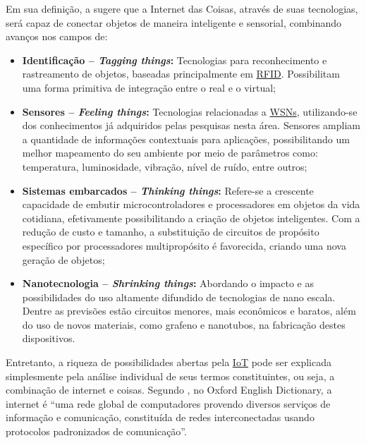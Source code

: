 \documentclass[twoside,english,brazilian]{UNISINOSmonografia}
\begin{document}
	Em sua definição, a  sugere que a Internet das 
	Coisas, através de suas tecnologias, será capaz de conectar objetos de 
	maneira inteligente e sensorial, combinando avanços nos campos de:
	\begin{itemize}
		\item \textbf{Identificação -- \textit{Tagging things}:} Tecnologias para 
		reconhecimento e rastreamento de objetos, baseadas principalmente 
		em \hyperref[siglas]{RFID}. Possibilitam uma forma primitiva de integração entre o 
		real e o virtual;
		
		\item \textbf{Sensores -- \textit{Feeling things}:} Tecnologias 
		relacionadas a \hyperref[siglas]{WSNs}, utilizando-se dos conhecimentos já adquiridos 
		pelas pesquisas nesta área. Sensores ampliam a quantidade de 
		informações contextuais para aplicações, possibilitando um melhor 
		mapeamento do seu ambiente por meio de parâmetros como: 
		temperatura, luminosidade, vibração, nível de ruído, entre outros;
		
		\item \textbf{Sistemas embarcados -- \textit{Thinking things}:} Refere-se 
		a crescente capacidade de embutir microcontroladores e 	
		processadores em objetos da vida cotidiana, efetivamente 
		possibilitando a criação de objetos inteligentes. Com a redução de 
		custo e tamanho, a substituição de circuitos de propósito 
		específico por processadores multipropósito é favorecida, criando 
		uma nova geração de objetos;
		
		\item \textbf{Nanotecnologia -- \textit{Shrinking things}:} Abordando o 
		impacto e as possibilidades do uso altamente difundido de 
		tecnologias de nano escala. Dentre as previsões estão circuitos 
		menores, mais econômicos e baratos, além do uso de novos 
		materiais, como grafeno e nanotubos, na fabricação destes 
		dispositivos.
	\end{itemize}
	
	Entretanto, a riqueza de possibilidades abertas pela \hyperref[siglas]{IoT} pode ser 
	explicada simplesmente pela análise individual de seus termos 
	constituintes, ou seja, a combinação de internet e coisas. Segundo 
	, no Oxford English Dictionary, a internet é 
	``uma rede global de computadores provendo diversos serviços de 
	informação e comunicação, constituída de redes interconectadas usando 
	protocolos padronizados de comunicação''.
	
\end{document}

